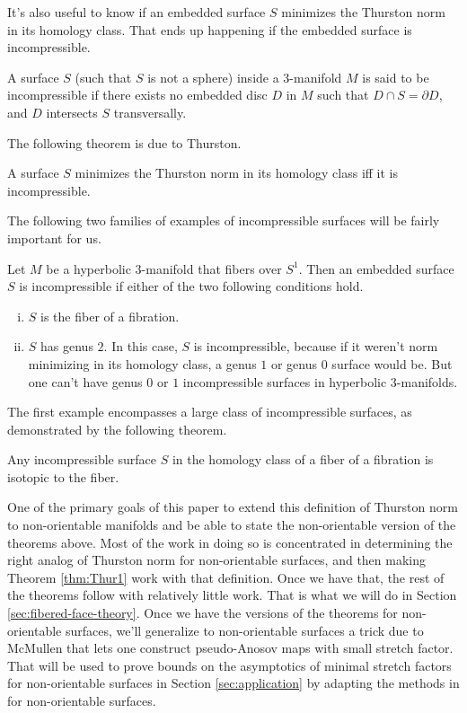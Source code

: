 It's also useful to know if an embedded surface $S$ minimizes the Thurston norm in its homology class. That ends
up happening if the embedded surface is incompressible.
\begin{defn}
  A surface $S$ (such that $S$ is not a sphere) inside a $3$-manifold $M$ is said to be incompressible if there
  exists no embedded disc $D$ in $M$ such that $D \cap S = \partial D$, and $D$ intersects $S$ transversally.
\end{defn}
The following theorem is due to Thurston.
\begin{thm}
  A surface $S$ minimizes the Thurston norm in its homology class iff it is incompressible.
\end{thm}
The following two families of examples of incompressible surfaces will be fairly important for us.
\begin{example}
  Let $M$ be a hyperbolic $3$-manifold that fibers over $S^1$. Then an embedded surface $S$ is incompressible
  if either of the two following conditions hold.
  \begin{enumerate}[(i)]
  \item $S$ is the fiber of a fibration.
  \item $S$ has genus $2$. In this case, $S$ is incompressible, because if it weren't norm minimizing in its homology
    class, a genus $1$ or genus $0$ surface would be. But one can't have genus $0$ or $1$ incompressible surfaces
    in hyperbolic $3$-manifolds.
  \end{enumerate}
\end{example}
The first example encompasses a large class of incompressible surfaces, as demonstrated by the following theorem.
\begin{thm}
  \label{thm:ThurIsotope}
  Any incompressible surface $S$ in the homology class of a fiber of a fibration is isotopic to the fiber.
\end{thm}

One of the primary goals of this paper to extend this definition of Thurston norm to non-orientable manifolds
and be able to state the non-orientable version of the theorems above. Most of the work in doing so is
concentrated in determining the right analog of Thurston norm for non-orientable surfaces, and then making
Theorem \ref{thm:Thur1} work with that definition. Once we have that, the rest of the theorems follow with
relatively little work. That is what we will do in Section \ref{sec:fibered-face-theory}. Once we have the
versions of the theorems for non-orientable surfaces, we'll generalize to non-orientable surfaces a trick due
to McMullen that lets one construct pseudo-Anosov maps with small stretch factor. That will be used to prove
bounds on the asymptotics of minimal stretch factors for non-orientable surfaces in Section
\ref{sec:application} by adapting the methods in \cite{yazdi2018pseudo} for non-orientable surfaces.
